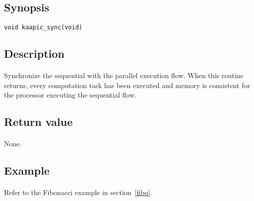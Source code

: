 \documentclass[a4paper, 11pt]{article}
\begin{document}
\subsection{Synopsis}
\begin{small}
\lstset{language=C}
\begin{lstlisting}[frame=tb]
void kaapic_sync(void)
\end{lstlisting}
\end{small}

\subsection{Description}
\paragraph{}
Synchronize the sequential with the parallel execution flow. When this routine
returns, every computation task has been executed and memory is consistent for
the processor executing the sequential flow.

\subsection{Return value}
\paragraph{}
None.

\subsection{Example}
\paragraph{}
Refer to the Fibonacci example in section~\ref{fibo}.
\end{document}
